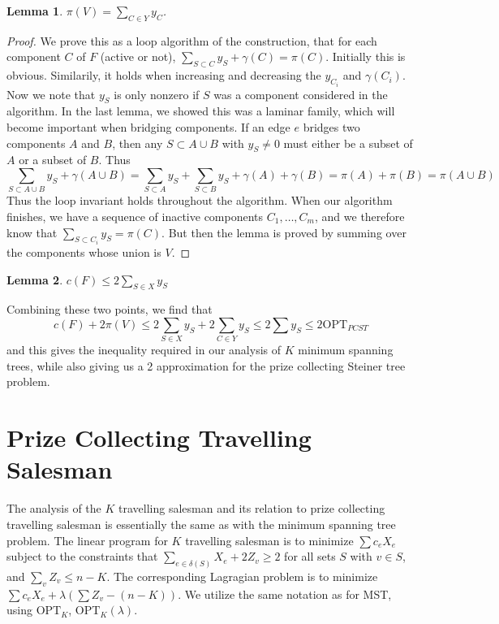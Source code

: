 \documentclass{article}
\theoremstyle{plain}
\newtheorem{lemma}{Lemma}
\theoremstyle{plain}
\begin{document}
\begin{lemma}
    $\pi(V) = \sum_{C \in Y} y_C$.
\end{lemma}
\begin{proof}
    We prove this as a loop algorithm of the construction, that for each component $C$ of $F$ (active or not), $\sum_{S \subset C} y_S + \gamma(C) = \pi(C)$. Initially this is obvious. Similarily, it holds when increasing and decreasing the $y_{C_i}$ and $\gamma(C_i)$. Now we note that $y_S$ is only nonzero if $S$ was a component considered in the algorithm. In the last lemma, we showed this was a laminar family, which will become important when bridging components. If an edge $e$ bridges two components $A$ and $B$, then any $S \subset A \cup B$ with $y_S \neq 0$ must either be a subset of $A$ or a subset of $B$. Thus
    \[ \sum_{S \subset A \cup B} y_S + \gamma(A \cup B) = \sum_{S \subset A} y_S + \sum_{S \subset B} y_S + \gamma(A) + \gamma(B) = \pi(A) + \pi(B) = \pi(A \cup B) \]
    Thus the loop invariant holds throughout the algorithm. When our algorithm finishes, we have a sequence of inactive components $C_1, \dots, C_m$, and we therefore know that $\sum_{S \subset C_i} y_S = \pi(C)$. But then the lemma is proved by summing over the components whose union is $V$.
\end{proof}

\begin{lemma}
    $c(F) \leq 2 \sum_{S \in X} y_S$
\end{lemma}

Combining these two points, we find that
%
\[ c(F) + 2 \pi(V) \leq 2 \sum_{S \in X} y_S + 2 \sum_{C \in Y} y_S \leq 2 \sum y_S \leq 2 \text{OPT}_{PCST} \]
%
and this gives the inequality required in our analysis of $K$ minimum spanning trees, while also giving us a 2 approximation for the prize collecting Steiner tree problem.

\section{Prize Collecting Travelling Salesman}

The analysis of the $K$ travelling salesman and its relation to prize collecting travelling salesman is essentially the same as with the minimum spanning tree problem. The linear program for $K$ travelling salesman is to minimize $\sum c_eX_e$ subject to the constraints that $\sum_{e \in \delta(S)} X_e + 2 Z_v \geq 2$ for all sets $S$ with $v \in S$, and $\sum_v Z_v \leq n - K$. The corresponding Lagragian problem is to minimize $\sum c_eX_e + \lambda (\sum Z_v - (n-K))$. We utilize the same notation as for MST, using $\text{OPT}_K$, $\text{OPT}_K(\lambda)$.
\end{document}
